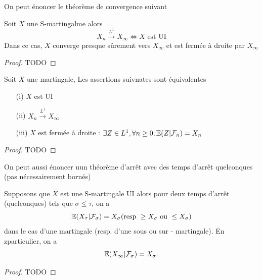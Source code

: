 On peut énoncer le théorème de convergence suivant 
\begin{theo}
Soit $X$ une S-martingalme alors 
$$
X_n\overset{ L^1}{\longrightarrow}X_\infty\Leftrightarrow
 X\text{ est UI}$$
 Dans ce cas, $X$ converge presque sûrement vers $X_\infty$ et est fermée à droite par $X_\infty$
\end{theo}
\begin{proof}
TODO
\end{proof}
\begin{coro}
Soit $X$ une martingale, Les assertions suivnates sont équivalentes
\begin{itemize}
    \item[(i)] $X$ est UI
    \item[(ii)] $X_n\overset{ L^1}{\longrightarrow}X_\infty$
    \item[(iii)] $X$ est fermée à droite : $\exists Z\in L^1, \forall n\geq 0, \mathbb{E}(Z|\mathcal{F}_n) = X_n$
\end{itemize}
\end{coro}
\begin{proof}
TODO
\end{proof}
On peut aussi énoncer uun théorème d'arrêt avec des temps d'arrêt quelconques (pas nécessairement bornés)
\begin{theo}
Supposons que $X$ est une S-martingale UI alors pour deux temps d'arrêt (quelconques) tels que $\sigma\leq \tau$, on a 
$$
\mathbb{E}(X_\tau|\mathcal{F}_\sigma)= X_\sigma (\text{resp }\geq X_\sigma\text{ ou }\leq X_\sigma) 
$$
dans le cas d'une martingale (resp. d'une sous ou sur - martingale). En zparticulier, on a 
$$
\mathbb{E}(X_\infty|\mathcal{F}_\sigma) = X_\sigma.
$$
\end{theo}
\begin{proof}
TODO
\end{proof}

